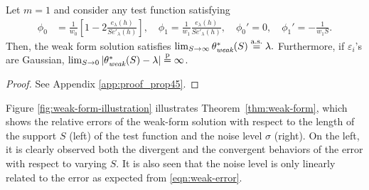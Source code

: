 \documentclass[final]{siamltex}
\begin{document}
\begin{theorem} \label{prop:weak-form-L1}
    Let $m=1$ and consider any test function satisfying 
    \begin{align*}
        \phi_0 &=\frac{1}{w_0}\left[1 - 2\frac{e_\lambda(h)}{Se'_\lambda(h)}\right], \quad 
        \phi_1 = \frac{1}{w_1}\frac{e_\lambda(h)}{S e'_\lambda(h)},
        \quad 
        \phi_0' = 0, \quad 
        \phi_1' = -\frac{1}{w_1S}.
    \end{align*}
    Then, the weak form solution satisfies 
    $\lim_{S \to \infty} \theta^*_\emph{\text{weak}}(S) \overset{\text{a.s.}}{=} \lambda.$
    Furthermore, if $\varepsilon_i$'s are Gaussian, 
    $\lim_{S \to 0} |\theta^*_\emph{\text{weak}}(S) - \lambda| \overset{\text{p}}{=} \infty$.
\end{theorem}
\begin{proof}
    See Appendix \ref{app:proof_prop45}.
\end{proof}


Figure \ref{fig:weak-form-illustration} illustrates Theorem~\ref{thm:weak-form}, which shows the relative errors of the weak-form solution with respect to the length of the support $S$ (left) of the test function and the noise level $\sigma$ (right).
On the left, it is clearly observed both the divergent and the convergent behaviors of the error with respect to varying $S$. 
It is also seen that the noise level is only linearly related to the error as expected from \eqref{eqn:weak-error}.
\end{document}
